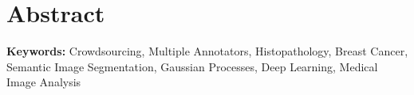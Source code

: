 \cleardoublepage
\chapter*{Abstract}

\textbf{\small Keywords:} Crowdsourcing, Multiple Annotators,
Histopathology, Breast Cancer, Semantic Image Segmentation,
Gaussian Processes, Deep Learning, Medical Image Analysis
